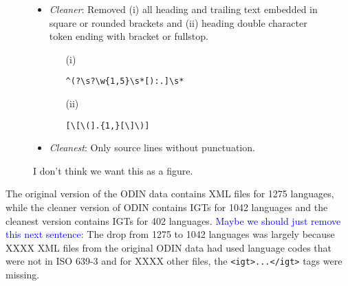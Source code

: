 \begin{figure}
\begin{itemize}
\item \emph{Cleaner}: Removed (i) all heading and trailing text embedded in square or rounded brackets and (ii) heading double character token ending with bracket or fullstop.
\begin{itemize}
\item[(i)]
\begin{Verbatim}
^(?\s?\w{1,5}\s*[):.]\s*
\end{Verbatim}
\item[(ii)] 
\begin{Verbatim}
[\[\(].{1,}[\]\)]
\end{Verbatim}
\end{itemize}
\item \emph{Cleanest}: Only source lines without punctuation.
\end{itemize}
\caption{I don't think we want this as a figure.}
\end{figure}




The original version of the ODIN data contains XML files for 1275 languages, while the cleaner version of ODIN contains IGTs for 1042 languages and the cleanest version contains IGTs for 402 languages.  \textcolor{blue}{Maybe we should just remove this next sentence:} The drop from 1275 to 1042 languages was largely because {\color{red} XXXX} XML files from the original ODIN data had used language codes that were not in ISO 639-3 and for {\color{red} XXXX} other files, the \texttt{<igt>...</igt>} tags were missing.

